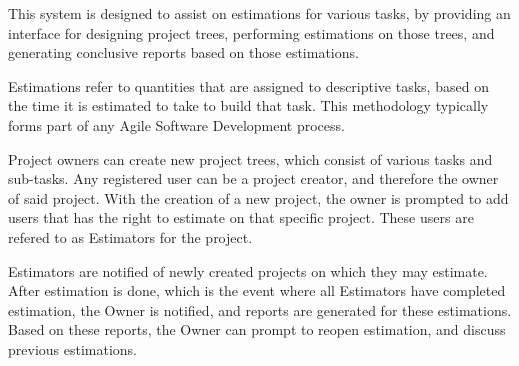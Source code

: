 This system is designed to assist on estimations for various tasks, by providing an interface for designing project trees, performing estimations on those trees, and generating conclusive reports based on those estimations.

Estimations refer to quantities that are assigned to descriptive tasks, based on the time it is estimated to take to build that task. This methodology typically forms part of any Agile Software Development process.

Project owners can create new project trees, which consist of various tasks and sub-tasks. Any registered user can be a project creator, and therefore the owner of said project. With the creation of a new project, the owner is prompted to add users that has the right to estimate on that specific project. These users are refered to as Estimators for the project.

Estimators are notified of newly created projects on which they may estimate. After estimation is done, which is the event where all Estimators have completed estimation, the Owner is notified, and reports are generated for these estimations. Based on these reports, the Owner can prompt to reopen estimation, and discuss previous estimations.